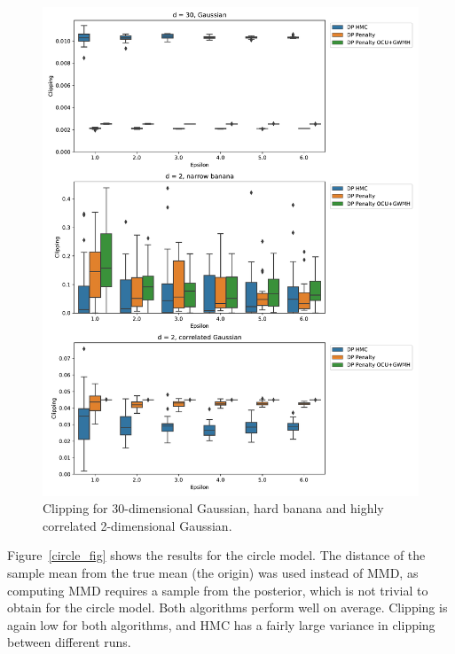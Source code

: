 \documentclass[english,twoside,openright]{HYgraduMLDS}
\begin{document}
\begin{figure}
  \centering
  \includegraphics[width=\textwidth]{figures/banana_extra_clipping}
  \caption{
    Clipping for 30-dimensional Gaussian, hard banana and highly correlated
    2-dimensional Gaussian.
  }
  \label{banana_extra_clipping_fig}
\end{figure}

Figure~\ref{circle_fig} shows the results for the circle model. The distance
of the sample mean from the true mean (the origin) was used instead of MMD,
as computing MMD requires a sample from the posterior, which is not trivial
to obtain for the circle model. Both algorithms perform well on average.
Clipping is again low
for both algorithms, and HMC has a fairly large variance in clipping between
different runs.
\end{document}
